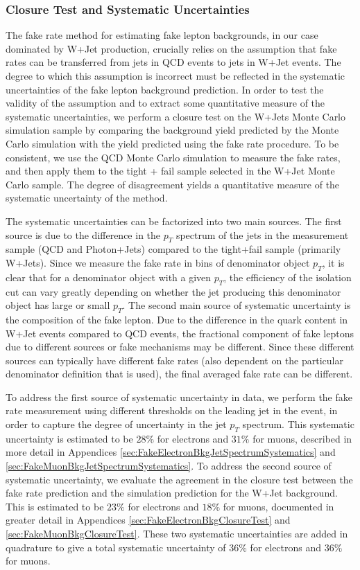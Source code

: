 \subsubsection{Closure Test and Systematic Uncertainties}
\label{sec:fakerateSystematics}

The fake rate method for estimating fake lepton backgrounds, in our case
dominated by W+Jet production, crucially relies on the assumption that
fake rates can be transferred from jets in QCD events to jets in W+Jet
events. The degree to which this assumption is incorrect must be 
reflected in the systematic uncertainties of the fake lepton 
background prediction. In order to test the validity of the assumption
and to extract some quantitative measure of the systematic uncertainties,
we perform a closure test on the W+Jets Monte Carlo simulation sample by 
comparing the background yield predicted by the Monte Carlo simulation
with the yield predicted using the fake rate procedure. To be consistent,
we use the QCD Monte Carlo simulation to measure the fake rates, and then
apply them to the tight + fail sample selected in the W+Jet Monte Carlo
sample. The degree of disagreement yields a quantitative measure of the 
systematic uncertainty of the method. 

The systematic uncertainties can be factorized into two main sources. 
The first source is due to the difference in the $p_{T}$ spectrum 
of the jets in the measurement sample (QCD and Photon+Jets) compared
to the tight+fail sample (primarily W+Jets). Since we measure the 
fake rate in bins of denominator object $p_{T}$, it is clear that
for a denominator object with a given $p_{T}$, the efficiency of the
isolation cut can vary greatly depending on whether the jet producing
this denominator object has large or small $p_{T}$. The second main
source of systematic uncertainty is the composition of the fake lepton.
Due to the difference in the quark content in W+Jet events compared
to QCD events, the fractional component of fake leptons due to different 
sources or fake mechanisms may be different. Since these different sources
can typically have different fake rates (also dependent on the particular 
denominator definition that is used), the final averaged fake rate can 
be different.

To address the first source of systematic uncertainty in data, we perform the
fake rate measurement using different thresholds on the leading jet
in the event, in order to capture the degree of uncertainty in 
the jet $p_{T}$ spectrum. This systematic uncertainty is estimated to 
be $28\%$ for electrons and $31\%$ for muons, described in more detail in Appendices 
\ref{sec:FakeElectronBkgJetSpectrumSystematics} and 
\ref{sec:FakeMuonBkgJetSpectrumSystematics}. To address the second 
source of systematic uncertainty, we evaluate the agreement in the closure
test between the fake rate prediction and the simulation prediction for 
the W+Jet background. This is estimated to be $23\%$ for electrons
and $18\%$ for muons, documented in greater 
detail in Appendices \ref{sec:FakeElectronBkgClosureTest} and
\ref{sec:FakeMuonBkgClosureTest}. These two 
systematic uncertainties are added in quadrature to give a total 
systematic uncertainty of $36\%$ for electrons and $36\%$ for muons. 

